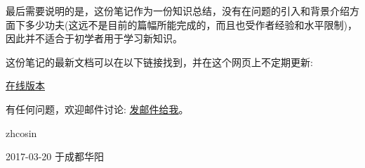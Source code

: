 最后需要说明的是，这份笔记作为一份知识总结，没有在问题的引入和背景介绍方面下多少功夫(这远不是目前的篇幅所能完成的，而且也受作者经验和水平限制)，因此并不适合于初学者用于学习新知识。

这份笔记的最新文档可以在以下链接找到，并在这个网页上不定期更新:

\href{https://coding.net/u/zhcosin/p/math-notes-publish/git/blob/master/elementary-math-note.pdf}{在线版本}

有任何问题，欢迎邮件讨论: \href{mailto:zhcosin@163.com?subject=初等数学笔记}{发邮件给我}。

\vspace{1.5cm}

\hfill zhcosin \hspace{5em}

\hfill 2017-03-20 于成都华阳 \hspace{1.5em}


